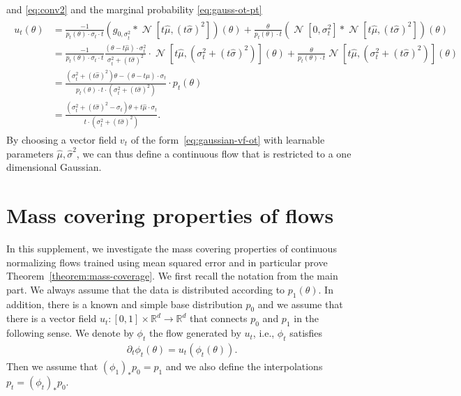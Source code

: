 \documentclass{article}
\theoremstyle{remark}
\newcommand{\R}{\mathbb{R}}
\DeclareMathOperator{\N}{\mathcal{N}}
\begin{document}
        and \eqref{eq:conv2} and the marginal probability \eqref{eq:gauss-ot-pt}
\begin{align}\label{eq:gaussian-vf-ot}
            \begin{split}
        u_t(\theta) & = 
        \frac{-1}{p_t(\theta)\cdot \sigma_t\cdot t} 
        \left(g_{0,\sigma_t^2}\ast
        \N\left[t\hat\mu,(t\hat\sigma)^2\right]\right)(\theta)
        + \frac{\theta}{p_t(\theta)\cdot t} 
        \left(\N\left[0,\sigma_t^2\right]\ast
        \N\left[t\hat\mu,(t\hat\sigma)^2\right]\right)(\theta)\\
        & = %
        \frac{-1}{p_t(\theta)\cdot \sigma_t\cdot t} 
        \frac{(\theta - t\hat\mu)\cdot\sigma_t^2}{\sigma_t^2 + (t\hat\sigma)^2}\cdot 
        \N\left[t\hat\mu, (\sigma_t^2 + (t\hat\sigma)^2)\right](\theta)+ \frac{\theta}{p_t(\theta)\cdot t} 
        \N\left[t\hat\mu, (\sigma_t^2 + (t\hat\sigma)^2)\right](\theta)\\
        & = \frac{(\sigma_t^2 + (t\hat\sigma)^2)\theta-(\theta - t\hat\mu)\cdot\sigma_t}
        {p_t(\theta)\cdot t\cdot(\sigma_t^2 + (t\hat\sigma)^2)}
        \cdot p_t(\theta)\\
        & = \frac{(\sigma_t^2 + (t\hat\sigma)^2 -\sigma_t)\theta + t\hat\mu\cdot\sigma_t}
        {t\cdot(\sigma_t^2 + (t\hat\sigma)^2)}.
    \end{split}
\end{align}
By choosing a vector field $v_t$ of the form~\eqref{eq:gaussian-vf-ot} with learnable parameters $\hat\mu,\hat\sigma^2$, we can thus define a continuous flow that is restricted to a one dimensional Gaussian.

\section{Mass covering properties of flows}
\label{sec:appendix-mass-covering-fm}
In this supplement, we investigate the mass covering properties of continuous normalizing flows trained using mean squared error and in particular prove Theorem~\ref{theorem:mass-coverage}. 
We first recall the notation from the main part.
We always assume that the data is distributed according to
$p_1(\theta)$.
In addition, there is a known and simple base distribution
$p_0$ and we assume that there is a vector field $u_t:[0,1]\times \R^d\to \R^d$ 
that connects $p_0$ and $p_1$ in the following sense.
We denote by
$\phi_t$ the flow generated by $u_t$, i.e., $\phi_t$
satisfies
\begin{align}
    \partial_t \phi_t(\theta)=u_t(\phi_t(\theta)).
\end{align}
Then we assume that 
$(\phi_1)_\ast p_0=p_1$ and we also define
the interpolations $p_t=(\phi_t)_\ast p_0$.
\end{document}
